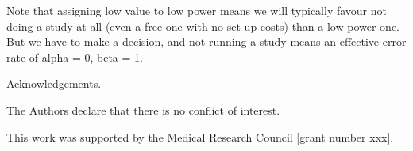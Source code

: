 \documentclass[sagev, Crown]{sagej}
\begin{document}
Note that assigning low value to low power means we will typically favour not doing a study at all (even a free one with no set-up costs) than a low power one. But we have to make a decision, and not running a study means an effective error rate of alpha = 0, beta = 1. 

\begin{acks}
Acknowledgements.
\end{acks}

\begin{dci}
The Authors declare that there is no conflict of interest.
\end{dci}

\begin{funding}
This work was supported by the Medical Research Council [grant number xxx].
\end{funding}



\end{document}
